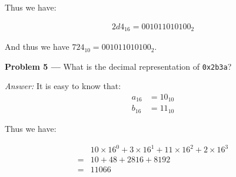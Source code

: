 \documentclass[11pt]{article}
\newcommand{\problem}[1]{\vspace*{2ex}\textbf{Problem #1 ---} }
\newcommand{\answer}{\textit{Answer: }}
\begin{document}
Thus we have:

\begin{equation*}
\begin{split}
2d4_{16} = 001011010100_{2}
\end{split}
\end{equation*}

And thus we have $724_{10} = 001011010100_{2}$.

\problem{5} What is the decimal representation of \texttt{0x2b3a}?

\answer It is easy to know that:
\begin{equation*}
\begin{split}
a_{16} &= 10_{10}\\
b_{16} &= 11_{10}
\end{split}
\end{equation*}

Thus we have:

\begin{equation*}
\begin{split}
  &10 \times 16^0 + 3 \times 16^1 + 11 \times 16^2 + 2 \times 16^3\\
= &10 + 48 + 2816 + 8192\\
= &11066\\
\end{split}
\end{equation*}
\end{document}
